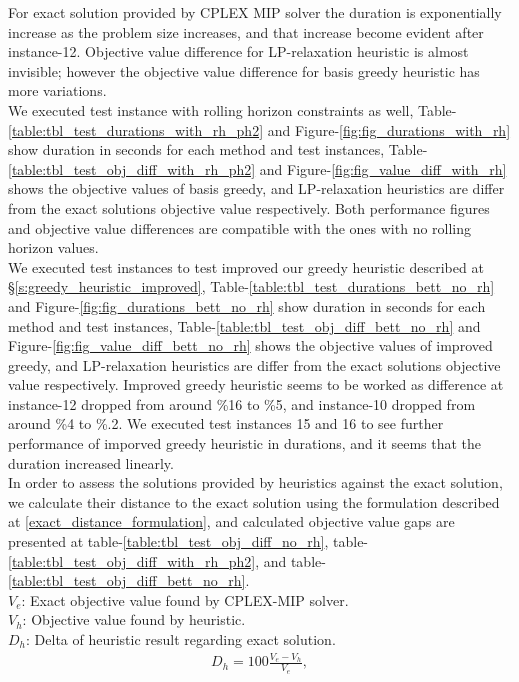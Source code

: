 \documentclass[11pt]{article}
\begin{document}
For exact solution provided by CPLEX MIP solver the duration is exponentially increase as the problem size increases, and that increase become evident after instance-12. Objective value difference for LP-relaxation heuristic is almost invisible; however the objective value difference for basis greedy heuristic has more variations.\\

We executed test instance with rolling horizon constraints as well, Table-\ref{table:tbl_test_durations_with_rh_ph2} and Figure-\ref{fig:fig_durations_with_rh} show duration in seconds for each method and test instances, Table-\ref{table:tbl_test_obj_diff_with_rh_ph2} and Figure-\ref{fig:fig_value_diff_with_rh} shows the objective values of basis greedy, and LP-relaxation heuristics are differ from the exact solutions objective value respectively. Both performance figures and objective value differences are compatible with the ones with no rolling horizon values.\\

We executed test instances to test improved our greedy heuristic described at \S \ref{s:greedy_heuristic_improved}, Table-\ref{table:tbl_test_durations_bett_no_rh} and Figure-\ref{fig:fig_durations_bett_no_rh} show duration in seconds for each method and test instances, Table-\ref{table:tbl_test_obj_diff_bett_no_rh} and Figure-\ref{fig:fig_value_diff_bett_no_rh} shows the objective values of improved greedy, and LP-relaxation heuristics are differ from the exact solutions objective value respectively. Improved greedy heuristic seems to be worked as difference at instance-12 dropped from around \%16 to \%5, and instance-10 dropped from around \%4 to \%.2. We executed test instances 15 and 16 to see further performance of imporved greedy heuristic in durations, and it seems that the duration increased linearly.\\


In order to assess the solutions provided by heuristics against the exact solution, we calculate their distance to the exact solution using the formulation described at \equationautorefname \eqref{exact_distance_formulation}, and calculated objective value gaps are presented at table-\ref{table:tbl_test_obj_diff_no_rh}, table-\ref{table:tbl_test_obj_diff_with_rh_ph2}, and table-\ref{table:tbl_test_obj_diff_bett_no_rh}.\\

\noindent $V_{e}$: Exact objective value found by CPLEX-MIP solver. \\
\noindent $V_{h}$: Objective value found by heuristic. \\
\noindent $D_{h}$: Delta of heuristic result regarding exact solution. \\
\begin{align}
&D_{h} = 100 \frac{V_{e} - V_{h}}{V_{e}}, \label{exact_distance_formulation}&
\end{align}\\
\end{document}

